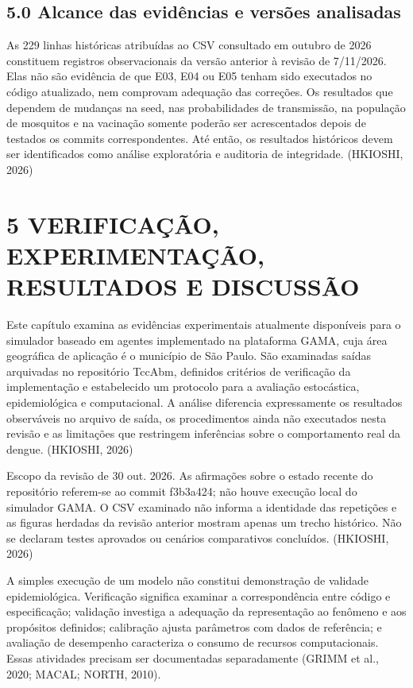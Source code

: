 \subsection{5.0 Alcance das evidências e versões
analisadas}\label{alcance-das-eviduxeancias-e-versuxf5es-analisadas}

As 229 linhas históricas atribuídas ao CSV consultado em outubro de 2026
constituem registros observacionais da versão anterior à revisão de
7/11/2026. Elas não são evidência de que E03, E04 ou E05 tenham sido
executados no código atualizado, nem comprovam adequação das correções.
Os resultados que dependem de mudanças na seed, nas probabilidades de
transmissão, na população de mosquitos e na vacinação somente poderão
ser acrescentados depois de testados os commits correspondentes. Até
então, os resultados históricos devem ser identificados como análise
exploratória e auditoria de integridade. (HKIOSHI, 2026)

\section{5 VERIFICAÇÃO, EXPERIMENTAÇÃO, RESULTADOS E
DISCUSSÃO}\label{verificauxe7uxe3o-experimentauxe7uxe3o-resultados-e-discussuxe3o}

Este capítulo examina as evidências experimentais atualmente disponíveis
para o simulador baseado em agentes implementado na plataforma GAMA,
cuja área geográfica de aplicação é o município de São Paulo. São
examinadas saídas arquivadas no repositório TccAbm, definidos critérios
de verificação da implementação e estabelecido um protocolo para a
avaliação estocástica, epidemiológica e computacional. A análise
diferencia expressamente os resultados observáveis no arquivo de saída,
os procedimentos ainda não executados nesta revisão e as limitações que
restringem inferências sobre o comportamento real da dengue. (HKIOSHI,
2026)

Escopo da revisão de 30 out. 2026. As afirmações sobre o estado recente
do repositório referem-se ao commit f3b3a424; não houve execução local
do simulador GAMA. O CSV examinado não informa a identidade das
repetições e as figuras herdadas da revisão anterior mostram apenas um
trecho histórico. Não se declaram testes aprovados ou cenários
comparativos concluídos. (HKIOSHI, 2026)

A simples execução de um modelo não constitui demonstração de validade
epidemiológica. Verificação significa examinar a correspondência entre
código e especificação; validação investiga a adequação da representação
ao fenômeno e aos propósitos definidos; calibração ajusta parâmetros com
dados de referência; e avaliação de desempenho caracteriza o consumo de
recursos computacionais. Essas atividades precisam ser documentadas
separadamente (GRIMM et al., 2020; MACAL; NORTH, 2010).


